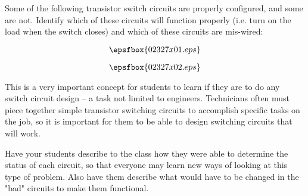 

Some of the following transistor switch circuits are properly configured, and some are not.  Identify which of these circuits will function properly (i.e. turn on the load when the switch closes) and which of these circuits are mis-wired:

$$\epsfbox{02327x01.eps}$$







$$\epsfbox{02327x02.eps}$$







This is a very important concept for students to learn if they are to do any switch circuit design -- a task not limited to engineers.  Technicians often must piece together simple transistor switching circuits to accomplish specific tasks on the job, so it is important for them to be able to design switching circuits that will work.

Have your students describe to the class how they were able to determine the status of each circuit, so that everyone may learn new ways of looking at this type of problem.  Also have them describe what would have to be changed in the "bad" circuits to make them functional.




